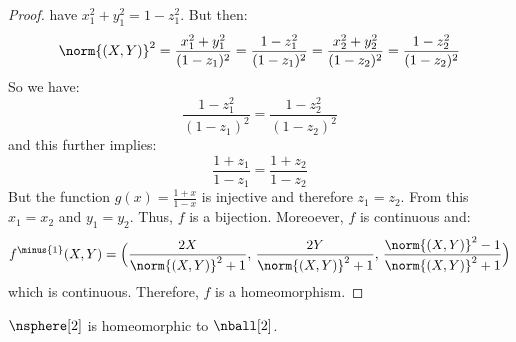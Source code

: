 \begin{proof}
            have $x_{1}^{2}+y_{1}^{2}=1-z_{1}^{2}$. But then:
            \begin{equation}
                \norm{(X,Y)}^{2}=\frac{x_{1}^2+y_{1}^2}{(1-z_{1})^{2}}
                    =\frac{1-z_{1}^{2}}{(1-z_{1})^{2}}
                    =\frac{x_{2}^{2}+y_{2}^{2}}{(1-z_{2})^{2}}
                    =\frac{1-z_{2}^{2}}{(1-z_{2})^{2}}
            \end{equation}
            So we have:
            \begin{equation}
                \frac{1-z_{1}^{2}}{(1-z_{1})^{2}}
                =\frac{1-z_{2}^{2}}{(1-z_{2})^{2}}
            \end{equation}
            and this further implies:
            \begin{equation}
                \frac{1+z_{1}}{1-z_{1}}=\frac{1+z_{2}}{1-z_{2}}
            \end{equation}
            But the function $g(x)=\frac{1+x}{1-x}$ is injective and
            therefore $z_{1}=z_{2}$. From this $x_{1}=x_{2}$ and
            $y_{1}=y_{2}$. Thus, $f$ is a bijection. Moreoever, $f$ is
            continuous and:
            \begin{equation}
                f^{\minus{1}}(X,Y)=\Big(%
                    \frac{2X}{\norm{(X,Y)}^{2}+1},\,
                    \frac{2Y}{\norm{(X,Y)}^{2}+1},\,
                    \frac{\norm{(X,Y)}^{2}-1}{\norm{(X,Y)}^{2}+1}%
                \Big)
            \end{equation}
            which is continuous. Therefore, $f$ is a homeomorphism.
        \end{proof}
        \begin{theorem}
            $\nsphere[2]$ is homeomorphic to $\nball[2]$.
        \end{theorem}
